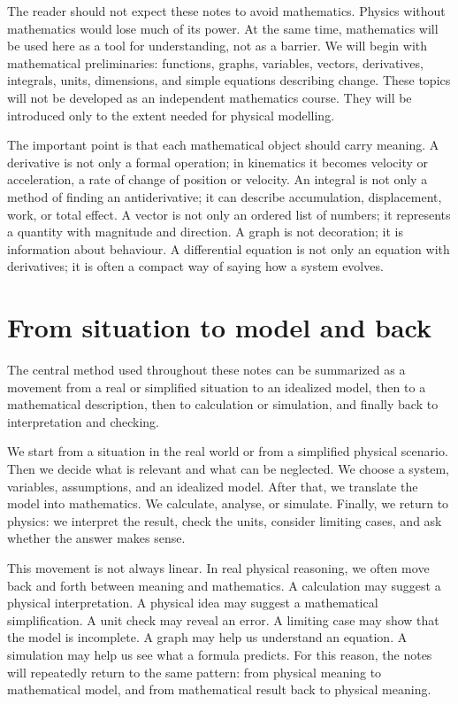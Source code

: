 The reader should not expect these notes to avoid mathematics. Physics without mathematics would lose much of its power. At the same time, mathematics will be used here as a tool for understanding, not as a barrier. We will begin with mathematical preliminaries: functions, graphs, variables, vectors, derivatives, integrals, units, dimensions, and simple equations describing change. These topics will not be developed as an independent mathematics course. They will be introduced only to the extent needed for physical modelling.

The important point is that each mathematical object should carry meaning. A derivative is not only a formal operation; in kinematics it becomes velocity or acceleration, a rate of change of position or velocity. An integral is not only a method of finding an antiderivative; it can describe accumulation, displacement, work, or total effect. A vector is not only an ordered list of numbers; it represents a quantity with magnitude and direction. A graph is not decoration; it is information about behaviour. A differential equation is not only an equation with derivatives; it is often a compact way of saying how a system evolves.

\section{From situation to model and back}

The central method used throughout these notes can be summarized as a movement from a real or simplified situation to an idealized model, then to a mathematical description, then to calculation or simulation, and finally back to interpretation and checking.

We start from a situation in the real world or from a simplified physical scenario. Then we decide what is relevant and what can be neglected. We choose a system, variables, assumptions, and an idealized model. After that, we translate the model into mathematics. We calculate, analyse, or simulate. Finally, we return to physics: we interpret the result, check the units, consider limiting cases, and ask whether the answer makes sense.

This movement is not always linear. In real physical reasoning, we often move back and forth between meaning and mathematics. A calculation may suggest a physical interpretation. A physical idea may suggest a mathematical simplification. A unit check may reveal an error. A limiting case may show that the model is incomplete. A graph may help us understand an equation. A simulation may help us see what a formula predicts. For this reason, the notes will repeatedly return to the same pattern: from physical meaning to mathematical model, and from mathematical result back to physical meaning.

